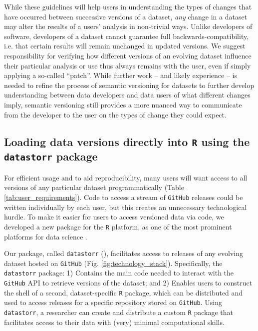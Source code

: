 \documentclass[a4paper,num-refs]{assets/oup-contemporary}
\begin{document}
While these guidelines will help users in understanding the types of changes that have occurred between successive versions of a dataset, \emph{any} change in a dataset may alter the results of a users' analysis in non-trivial ways. Unlike developers of software, developers of a dataset cannot guarantee full backwards-compatibility, i.e. that certain results will remain unchanged in updated versions. We suggest responsibility for verifying how different versions of an evolving dataset influence their particular analysis or use thus always remains with the user, even if simply applying a so-called ``patch''. While further work -- and likely experience -- is needed to refine the process of semantic versioning for datasets to further develop understanding between data developers and data users of what different changes imply, semantic versioning still provides a more nuanced way to communicate from the developer to the user on the types of change they could expect.

\subsection{Loading data versions directly into \texttt{R} using the \texttt{datastorr} package}

For efficient usage and to aid reproducibility, many users will want access to all versions of any particular dataset programmatically (Table \ref{tab:user_requirements}). Code to access a stream of \texttt{GitHub} releases could be written individually by each user, but this creates an unnecessary technological hurdle. To make it easier for users to access versioned data via code, we developed a new package for the \texttt{R} platform, as one of the most prominent platforms for data science \cite{R-2017}.

Our package, called \texttt{datastorr} (), facilitates access to releases of any evolving dataset hosted on \texttt{GitHub} (Fig. \ref{fig:technology_stack}). Specifically, the \texttt{datastorr} package: 1) Contains the main code needed to interact with the \texttt{GitHub} API to retrieve versions of the dataset; and 2) Enables users to construct the shell of a second, dataset-specific \texttt{R} package, which can be distributed and used to access releases for a specific repository stored on \texttt{GitHub}. Using \texttt{datastorr}, a researcher can create and distribute a custom \texttt{R} package that facilitates access to their data with (very) minimal computational skills.
\end{document}
